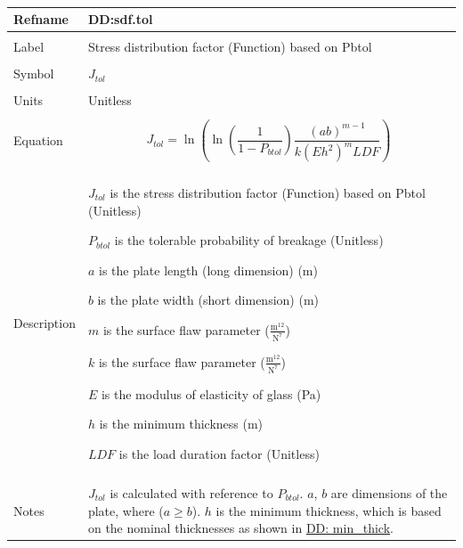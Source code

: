 \documentclass[12pt]{article}
\begin{document}
~\newline
\noindent \begin{minipage}{\textwidth}
\begin{tabular}{p{} p{}}
\toprule \textbf{Refname} & \textbf{DD:sdf.tol}
\label{DD:sdf.tol}
\\ \midrule \\
Label & Stress distribution factor (Function) based on Pbtol
\\ \midrule \\
Symbol & ${J_{tol}}$
\\ \midrule \\
Units & Unitless
\\ \midrule \\
Equation & \begin{dmath}
           {J_{tol}}=\ln\left(\ln\left(\frac{1}{1-{P_{btol}}}\right) \frac{\left(a b\right)^{m-1}}{k \left(E h^{2}\right)^{m} LDF}\right)
           \end{dmath}
\\ \midrule \\
Description & \begin{symbDescription}
              \item{${J_{tol}}$ is the stress distribution factor (Function) based on Pbtol (Unitless)}
              \item{${P_{btol}}$ is the tolerable probability of breakage (Unitless)}
              \item{$a$ is the plate length (long dimension) (m)}
              \item{$b$ is the plate width (short dimension) (m)}
              \item{$m$ is the surface flaw parameter ($\frac{\text{m}^{12}}{\text{N}^{7}}$)}
              \item{$k$ is the surface flaw parameter ($\frac{\text{m}^{12}}{\text{N}^{7}}$)}
              \item{$E$ is the modulus of elasticity of glass (Pa)}
              \item{$h$ is the minimum thickness (m)}
              \item{$LDF$ is the load duration factor (Unitless)}
              \end{symbDescription}
\\ \midrule \\
Notes & ${J_{tol}}$  is calculated with reference to  ${P_{btol}}$.
        $a$, $b$ are dimensions of the plate, where ($a\geq{}b$).
        $h$ is the minimum thickness, which is based on the nominal thicknesses as shown in \hyperref[DD:min.thick]{DD: min\_thick}.

\end{tabular}
\end{minipage}
\end{document}
